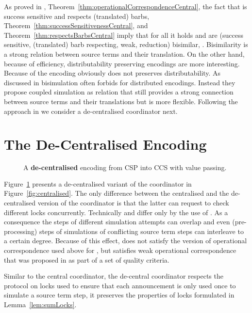 \documentclass[]{eptcs}
\begin{document}
As proved in \cite{petersGlabbeek15}, Theorem~\ref{thm:operationalCorrespondenceCentral}, the fact that  is success sensitive and respects (translated) barbs, Theorem~\ref{thm:successSensitivenessCentral}, and Theorem~\ref{thm:respectsBarbsCentral} imply that for all  it holds  and  are (success sensitive, (translated) barb respecting, weak, reduction) bisimilar, \ie .
Bisimilarity is a strong relation between source terms and their translation. On the other hand, because of efficiency, distributability preserving encodings are more interesting.
Because of  the encoding  obviously does not preserves distributability. As discussed in \cite{parrowCoupled92} bisimulation often forbids for distributed encodings. Instead they propose coupled simulation as relation that still provides a strong connection between source terms and their translations but is more flexible. Following the approach in \cite{parrowCoupled92} we consider a de-centralised coordinator next.

\section{The De-Centralised Encoding}
\label{sec:decentral}

\begin{figure}
	
	\caption{A \textbf{de-centralised} encoding from CSP into CCS with value passing.}
	\label{fig:decentralised}
\end{figure}

Figure~\ref{fig:decentralised} presents a de-centralised variant of the coordinator in Figure~\ref{fig:centralised}.
The only difference between the centralised and the de-centralised version of the coordinator is that the latter can request to check different locks concurrently. Technically  and  differ only by the use of . As a consequence the steps of different simulation attempts can overlap and even (pre-processing) steps of simulations of conflicting source term steps can interleave to a certain degree. Because of this effect,  does not satisfy the version of operational correspondence used above for , but  satisfies weak operational correspondence that was proposed in \cite{gorla10} as part of a set of quality criteria.

Similar to the central coordinator, the de-central coordinator respects the protocol on locks used to ensure that each announcement is only used once to simulate a source term step, \ie it preserves the properties of locks formulated in Lemma~\ref{lem:sumLocks}.
\end{document}
